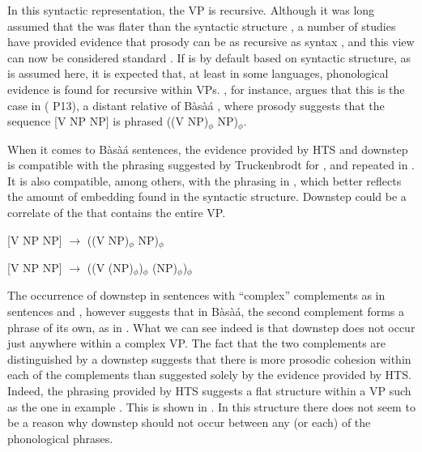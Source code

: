 \documentclass[output=paper,newtxmath,modfonts,nonflat,hidelinks]{langsci/langscibook}
\begin{document}
\noindent In this syntactic representation, the VP is recursive. Although it was long assumed that the  was flater than the syntactic structure \citep{Selkirk81,Selkirk84,Selkirk86, NesporVogel86}, a number of studies have provided evidence that prosody can be as recursive as syntax \citep{Ladd86}, and this view can now be considered standard \citep[a.o.][]{Selkirk95b, Selkirk09, Selkirk11, Truckenbrodt99, Wagner05, Elfner12}. If  is by default based on syntactic structure, as is assumed here, it is expected that, at least in some languages, phonological evidence is found for recursive  within VPs. \citet{Truckenbrodt99}, for instance, argues that this is the case in  ( P13), a distant relative of Bàsà{á} \citep{Odden87,Odden90}, where prosody suggests that the sequence [V NP NP] is phrased ((V NP)$_{\phi}$ NP)$_{\phi}$. 

When it comes to Bàsà{á} sentences, the evidence provided by HTS and downstep is compatible with the phrasing suggested by Truckenbrodt for , and repeated in . It is also compatible, among others, with the phrasing in  \citep{Selkirk09, Selkirk11}, which better reflects the amount of embedding found in the syntactic structure. Downstep could be a correlate of the  that contains the entire VP.


\ea{} [V NP NP] $\to$ ((V NP)$_{\phi}$ NP)$_{\phi}$\label{ex:HamlaouiMakasso:23}
\z

\ea{} [V NP NP] $\to$ ((V (NP)$_{\phi}$)$_{\phi}$ (NP)$_{\phi}$)$_{\phi}$\label{ex:HamlaouiMakasso:24}
\z

The occurrence of downstep in sentences with ``complex'' complements as in sentences  and , however suggests that in Bàsà{á}, the second complement forms a phrase of its own, as in . What we can see indeed is that downstep does not occur just anywhere within a complex VP. The fact that the two complements are distinguished by a downstep suggests that there is more prosodic cohesion within each of the complements than suggested solely by the evidence provided by HTS. Indeed, the phrasing provided by HTS suggests a flat structure within a VP such as the one in example . This is shown in . In this structure there does not seem to be a reason why downstep should not occur between any (or each) of the phonological phrases.
\end{document}
